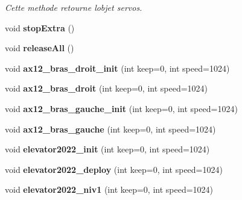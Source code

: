 \begin{DoxyCompactItemize}
\begin{DoxyCompactList}\small\item\em Cette methode retourne l\textquotesingle{}objet servos. \end{DoxyCompactList}\item 
\mbox{\label{classOPOS6UL__ActionsExtended_a87bb61d89759101cac844e7c399f2f61}} 
void {\bfseries stop\+Extra} ()
\item 
\mbox{\label{classOPOS6UL__ActionsExtended_a0bc7d581ad9cbae899f7f244340a5429}} 
void {\bfseries release\+All} ()
\item 
\mbox{\label{classOPOS6UL__ActionsExtended_a2b9fff85f7bc3e11a93f6224f3359597}} 
void {\bfseries ax12\+\_\+bras\+\_\+droit\+\_\+init} (int keep=0, int speed=1024)
\item 
\mbox{\label{classOPOS6UL__ActionsExtended_a68aeb5ec0b39e8694045c01ae8eb11d0}} 
void {\bfseries ax12\+\_\+bras\+\_\+droit} (int keep=0, int speed=1024)
\item 
\mbox{\label{classOPOS6UL__ActionsExtended_ad5d1381a90549a99c68fb7412a31c28f}} 
void {\bfseries ax12\+\_\+bras\+\_\+gauche\+\_\+init} (int keep=0, int speed=1024)
\item 
\mbox{\label{classOPOS6UL__ActionsExtended_acbc66db12838ca1d4b3d6d545ca8d4bc}} 
void {\bfseries ax12\+\_\+bras\+\_\+gauche} (int keep=0, int speed=1024)
\item 
\mbox{\label{classOPOS6UL__ActionsExtended_a57fef75182cca7f60accef382ec8a3e4}} 
void {\bfseries elevator2022\+\_\+init} (int keep=0, int speed=1024)
\item 
\mbox{\label{classOPOS6UL__ActionsExtended_a9f41e573b4c2a9370079a268d2b9a16c}} 
void {\bfseries elevator2022\+\_\+deploy} (int keep=0, int speed=1024)
\item 
\mbox{\label{classOPOS6UL__ActionsExtended_a9f15c28dd56e970d8eee08f69a394d47}} 
void {\bfseries elevator2022\+\_\+niv1} (int keep=0, int speed=1024)

\end{DoxyCompactItemize}
